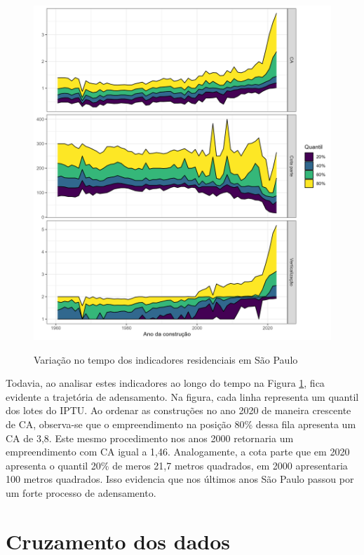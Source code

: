 \begin{figure}[h]
    \centering
    \caption{Variação no tempo dos indicadores residenciais em São Paulo}
    \includegraphics[width = \linewidth]{imagens/indicadores_tempo.png}
    \label{fig:indicadores-tempo}
\end{figure}

Todavia, ao analisar estes indicadores ao longo do tempo na Figura \ref{fig:indicadores-tempo}, fica evidente a trajetória de adensamento. Na figura, cada linha representa um quantil dos lotes do IPTU. Ao ordenar as construções no ano 2020 de maneira crescente de CA, observa-se que o empreendimento na posição 80\% dessa fila apresenta um CA de 3,8. Este mesmo procedimento nos anos 2000 retornaria um empreendimento com CA igual a 1,46. Analogamente, a cota parte que em 2020 apresenta o quantil 20\% de meros 21,7 metros quadrados, em 2000 apresentaria 100 metros quadrados. Isso evidencia que nos últimos anos São Paulo passou por um forte processo de adensamento.

\section*{Cruzamento dos dados}


